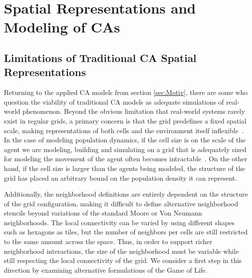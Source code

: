 \documentclass[a4paper,11pt,twoside]{report}
\begin{document}

\section{Spatial Representations and Modeling of CAs}
\label{sec:Model}
\subsection{Limitations of Traditional CA Spatial Representations}

Returning to the applied CA models from section \ref{sec:Motiv}, there are some who question the viability of traditional CA models as adequate simulations of real-world phenomenon. Beyond the obvious limitation that real-world systems rarely exist in regular grids, a primary concern is that the grid predefines a fixed spatial scale, making representations of both cells and the environment itself inflexible~\cite{he98}. In the case of modeling population dynamics, if the cell size is on the scale of the agent we are modeling, building and simulating on a grid that is adequately sized for modeling the movement of the agent often becomes intractable~\cite{bi07}. On the other hand, if the cell size is larger than the agents being modeled, the structure of the grid has placed an arbitrary bound on the population density it can represent.

Additionally, the neighborhood definitions are entirely dependent on the structure of the grid configuration, making it difficult to define alternative neighborhood stencils beyond variations of the standard Moore or Von Neumann neighborhoods. The local connectivity can be varied by using different shapes such as hexagons as tiles, but the number of neighbors per cells are still restricted to the same amount across the space. Thus, in order to support richer neighborhood interactions, the size of the neighborhood must be variable while still respecting the local connectivity of the grid. We consider a first step in this direction by examining alternative formulations of the Game of Life.

\end{document}
